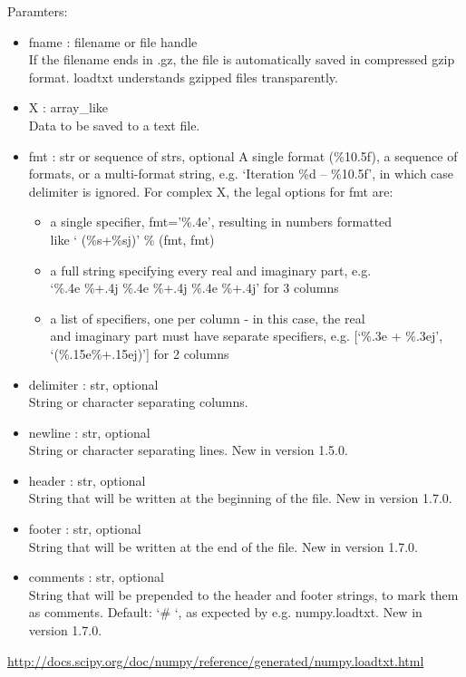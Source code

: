 Paramters:
\begin{itemize}
\item
fname : filename or file handle\\
If the filename ends in .gz, the file is automatically saved in compressed gzip format. loadtxt understands gzipped files transparently.
\item
X : array\_like\\
Data to be saved to a text file.
\item
fmt : str or sequence of strs, optional
A single format (\%10.5f), a sequence of formats, or a multi-format string, e.g. ‘Iteration \%d – \%10.5f’, in which case delimiter is ignored. For complex X, the legal options for fmt are:
	\begin{itemize}
	\item
	a single specifier, fmt=’\%.4e’, resulting in numbers formatted\\
	like ‘ (\%s+\%sj)’ \% (fmt, fmt)
	\item
	a full string specifying every real and imaginary part, e.g.\\
	‘\%.4e \%+.4j \%.4e \%+.4j \%.4e \%+.4j’ for 3 columns
	\item
	a list of specifiers, one per column - in this case, the real\\
	and imaginary part must have separate specifiers, e.g. [‘\%.3e + \%.3ej’, ‘(\%.15e\%+.15ej)’] for 2 columns
\end{itemize}
\item
delimiter : str, optional\\
String or character separating columns.
\item
newline : str, optional\\
String or character separating lines.
New in version 1.5.0.
\item
header : str, optional\\
String that will be written at the beginning of the file.
New in version 1.7.0.
\item
footer : str, optional\\
String that will be written at the end of the file.
New in version 1.7.0.
\item
comments : str, optional\\
String that will be prepended to the header and footer strings, to mark them as comments. Default: ‘\# ‘, as expected by e.g. numpy.loadtxt.
New in version 1.7.0.
\end{itemize}


\url{http://docs.scipy.org/doc/numpy/reference/generated/numpy.loadtxt.html}

